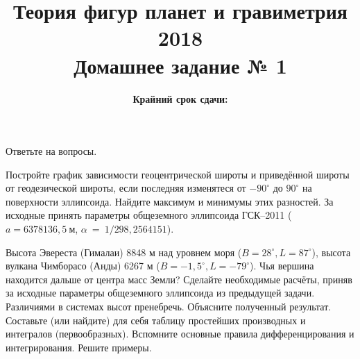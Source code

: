 \documentclass[11pt, a4paper,addpoints]{exam}
\title{{\Large Теория фигур планет и гравиметрия 2018}\\ 
    {\bf\Large Домашнее задание № 1}}
\author{}
\date{\normalsize\bf Крайний срок сдачи: \DTMusedate{deadline}}
\theoremstyle{remark}
\renewcommand{\phi}{\ensuremath{\varphi}}
\renewcommand{\theta}{\vartheta}
\begin{document}
\maketitle
\thispagestyle{empty}
\begin{questions}
    \question[1] Ответьте на вопросы.
    \question[1] Постройте график зависимости геоцентрической широты и приведённой широты
    от геодезической широты, если последняя изменятеся от $-90^\circ$ до $90^\circ$ на
    поверхности эллипсоида. Найдите максимум и минимумы этих разностей. За исходные принять параметры общеземного эллипсоида ГСК--2011 
    ($a = 6378136,5\ \text{м}$, $\alpha~=~1/298,2564151$).

    \question[1] Высота Эвереста (Гималаи) 8848 м над уровнем моря ($B = 28^\circ, L = 87^\circ$), 
    высота вулкана Чимборасо (Анды) 6267 м ($B = -1,5^\circ, L = -79^\circ$). Чья вершина находится дальше от
    центра масс Земли? 
    Сделайте необходимые расчёты, приняв за исходные параметры общеземного эллипсоида из предыдущей
    задачи. Различиями в системах высот пренебречь. Объясните полученный результат.
    \question[2] Составьте (или найдите) для себя таблицу простейших производных и интегралов (первообразных). Вспомните основные
    правила дифференцирования и интегрирования. Решите примеры.
    \begin{parts}

\end{parts}
\end{questions}
\end{document}
